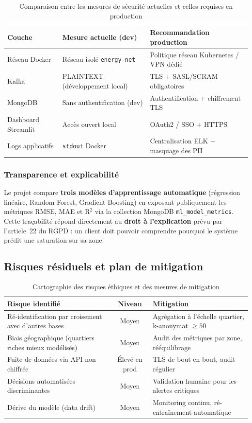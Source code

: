\documentclass[11pt,a4paper]{article}
\begin{document}
\begin{table}[h!]
\centering
\begin{tabularx}{\textwidth}{lYY}
\toprule
{}
\textbf{Couche} & \textbf{Mesure actuelle (dev)} & \textbf{Recommandation production} \\
\midrule
Réseau Docker & Réseau isolé \texttt{energy-net} & Politique réseau Kubernetes / VPN dédié \\
Kafka & PLAINTEXT (développement local) & TLS + SASL/SCRAM obligatoires \\
MongoDB & Sans authentification (dev) & Authentification + chiffrement TLS \\
Dashboard Streamlit & Accès ouvert local & OAuth2 / SSO + HTTPS \\
Logs applicatifs & \texttt{stdout} Docker & Centralisation ELK + masquage des PII \\
\bottomrule
\end{tabularx}
\caption{Comparaison entre les mesures de sécurité actuelles et celles requises en production}
\end{table}

\subsubsection{Transparence et explicabilité}
Le projet compare \textbf{trois modèles d'apprentissage automatique} (régression linéaire, Random Forest, Gradient Boosting) en exposant publiquement les métriques RMSE, MAE et R$^2$ via la collection MongoDB \texttt{ml\_model\_metrics}. Cette traçabilité répond directement au \textbf{droit à l'explication} prévu par l'article~22 du RGPD : un client doit pouvoir comprendre pourquoi le système prédit une saturation sur sa zone.

\subsection{Risques résiduels et plan de mitigation}

\begin{table}[h!]
\centering
\begin{tabularx}{\textwidth}{Y c Y}
\toprule
{}
\textbf{Risque identifié} & \textbf{Niveau} & \textbf{Mitigation} \\
\midrule
Ré-identification par croisement avec d'autres bases & Moyen & Agrégation à l'échelle quartier, k-anonymat $\geq 50$ \\
Biais géographique (quartiers riches mieux modélisés) & Moyen & Audit des métriques par zone, rééquilibrage \\
Fuite de données via API non chiffrée & Élevé en prod & TLS de bout en bout, audit régulier \\
Décisions automatisées discriminantes & Moyen & Validation humaine pour les alertes critiques \\
Dérive du modèle (data drift) & Moyen & Monitoring continu, ré-entraînement automatique \\
\bottomrule
\end{tabularx}
\caption{Cartographie des risques éthiques et des mesures de mitigation}
\end{table}
\end{document}
